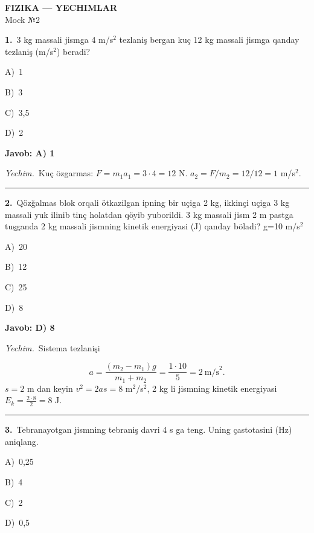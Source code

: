 \documentclass[11pt,a4paper]{article}
\newcommand{\opt}[2]{\hspace*{4mm}#1)\ #2\par}
\begin{document}
\begin{center}{\Large\textbf{FIZIKA — YECHIMLAR}}\\[2pt]{\large Mock №2}\end{center}
\noindent\begin{minipage}{\linewidth}
\textbf{1.}\ 3 kg massali jismga 4 m/s$^{2}$ tezlaniş bergan kuç 12 kg massali jismga qanday tezlaniş (m/s$^{2}$) beradi?\par\smallskip
\opt{A}{1}
\opt{B}{3}
\opt{C}{3,5}
\opt{D}{2}
\end{minipage}\vspace{2pt}\par
\noindent\colorbox{gray!12}{\parbox{\dimexpr\linewidth-2\fboxsep}{\textbf{Javob: A) 1}}}\par\smallskip
\noindent\textit{Yechim.}\ Kuç özgarmas: $F=m_1a_1=3\cdot4=12$ N. $a_2=F/m_2=12/12=1$ m/s$^2$.\par\par\medskip\hrule\medskip
{}\noindent\begin{minipage}{\linewidth}
\textbf{2.}\ Qözğalmas blok orqali ötkazilgan ipning bir uçiga 2 kg, ikkinçi uçiga 3 kg massali yuk ilinib tinç holatdan qöyib yuborildi. 3 kg massali jism 2 m pastga tuşganda 2 kg massali jismning kinetik energiyasi (J) qanday böladi? g=10 m/s$^{2}$\par\smallskip
\opt{A}{20}
\opt{B}{12}
\opt{C}{25}
\opt{D}{8}
\end{minipage}\vspace{2pt}\par
\noindent\colorbox{gray!12}{\parbox{\dimexpr\linewidth-2\fboxsep}{\textbf{Javob: D) 8}}}\par\smallskip
\noindent\textit{Yechim.}\ Sistema tezlanişi\par
\[a=\frac{(m_2-m_1)g}{m_1+m_2}=\frac{1\cdot10}{5}=2\ \text{m/s}^2.\]
$s=2$ m dan keyin $v^2=2as=8$ m$^2$/s$^2$, 2 kg li jismning kinetik energiyasi $E_k=\frac{2\cdot8}{2}=8$ J.\par\par\medskip\hrule\medskip
{}\noindent\begin{minipage}{\linewidth}
\textbf{3.}\ Tebranayotgan jismning tebraniş davri 4 s ga teng. Uning çastotasini (Hz) aniqlang.\par\smallskip
\opt{A}{0,25}
\opt{B}{4}
\opt{C}{2}
\opt{D}{0,5}
\end{minipage}\vspace{2pt}\par
\end{document}
